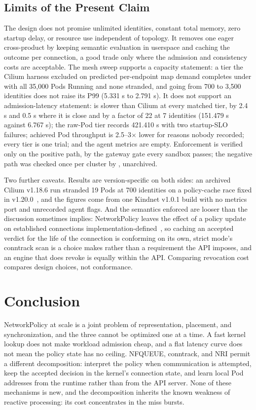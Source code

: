 \subsection{Limits of the Present Claim}

The design does not promise unlimited identities, constant total
memory, zero startup delay, or resource use independent of topology. It
removes one eager cross-product by keeping semantic evaluation in
userspace and caching the outcome per connection, a good trade only
where the admission and consistency costs are acceptable. The \sys{}
mesh sweep supports a capacity statement: a tier the Cilium harness
excluded on predicted per-endpoint map demand completes under \sys{}
with all 35,000 Pods Running and none stranded, and going from 700 to
3,500 identities does not raise its P99 (5.331 s to 2.791 s). It does
not support an admission-latency statement: \sys{} is slower than
Cilium at every matched tier, by 2.4 s and 0.5 s where it is close and
by a factor of 22 at 7 identities (151.479 s against 6.767 s); the
raw-Pod tier records 421.410 s with two startup-SLO failures; achieved
Pod throughput is 2.5--3$\times$ lower for reasons nobody recorded;
every tier is one trial; and the agent metrics are empty. Enforcement
is verified only on the positive path, by the gateway gate every
sandbox passes; the negative path was checked once per cluster by
, unarchived.

Two further caveats. Results are version-specific on both sides: an
archived Cilium v1.18.6 run stranded 19 Pods at 700 identities on a
policy-cache race fixed in v1.20.0~\cite{cilium7515}, and the \sys{}
figures come from one Kindnet v1.0.1 build with no metrics port and
unrecorded agent flags. And the semantics enforced are looser than the
discussion sometimes implies: NetworkPolicy leaves the effect of a
policy update on established connections
implementation-defined~\cite{k8snetworkpolicy}, so caching an accepted
verdict for the life of the connection is conforming on its own, strict
mode's conntrack scan is a choice \sys{} makes rather than a
requirement the API imposes, and an engine that does revoke is equally
within the API. Comparing revocation cost compares design choices, not
conformance.

\section{Conclusion}
\label{sec:conclusion}

NetworkPolicy at scale is a joint problem of representation, placement,
and synchronization, and the three cannot be optimized one at a time. A
fast kernel lookup does not make workload admission cheap, and a flat
latency curve does not mean the policy state has no ceiling. NFQUEUE,
conntrack, and NRI permit a different decomposition: interpret the
policy when communication is attempted, keep the accepted decision in
the kernel's connection state, and learn local Pod addresses from the
runtime rather than from the API server. None of these mechanisms is
new, and the decomposition inherits the known weakness of reactive
processing: its cost concentrates in the miss bursts.

